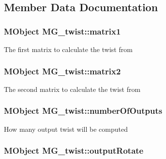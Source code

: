 \subsection{Member Data Documentation}
\hypertarget{class_m_g__twist_a1f56e50333669ce2a38f71e3226ab18e}{
\subsubsection[{matrix1}]{\setlength{\rightskip}{0pt plus 5cm}M\-Object M\-G\-\_\-twist\-::matrix1\hspace{0.3cm}{\ttfamily [static]}}}\label{class_m_g__twist_a1f56e50333669ce2a38f71e3226ab18e}
The first matrix to calculate the twist from \hypertarget{class_m_g__twist_a529b723501fff0dd68b7062a8816195b}{
\subsubsection[{matrix2}]{\setlength{\rightskip}{0pt plus 5cm}M\-Object M\-G\-\_\-twist\-::matrix2\hspace{0.3cm}{\ttfamily [static]}}}\label{class_m_g__twist_a529b723501fff0dd68b7062a8816195b}
The second matrix to calculate the twist from \hypertarget{class_m_g__twist_a53c3b473d1227aec0ff7a13d7a2ea246}{
\subsubsection[{number\-Of\-Outputs}]{\setlength{\rightskip}{0pt plus 5cm}M\-Object M\-G\-\_\-twist\-::number\-Of\-Outputs\hspace{0.3cm}{\ttfamily [static]}}}\label{class_m_g__twist_a53c3b473d1227aec0ff7a13d7a2ea246}
How many output twist will be computed \hypertarget{class_m_g__twist_a3908aa57e152eb462614eefb56bb82fb}{
\subsubsection[{output\-Rotate}]{\setlength{\rightskip}{0pt plus 5cm}M\-Object M\-G\-\_\-twist\-::output\-Rotate\hspace{0.3cm}{\ttfamily [static]}}}\label{class_m_g__twist_a3908aa57e152eb462614eefb56bb82fb}
